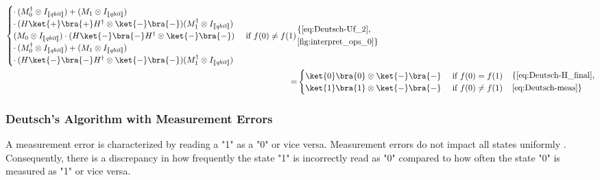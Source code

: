 \begin{align*}
\begin{cases}
    \cdot \hspace{2pt} (M_0^\dag \otimes I_{\llbracket \textit{qbit} \rrbracket}) + (M_1 \otimes I_{\llbracket \textit{qbit} \rrbracket})     \\
    \cdot \hspace{2pt} (H\ket{+} \bra{+}H^\dag \otimes \ket{-}\bra{-}) (M_1^\dag \otimes I_{\llbracket \textit{qbit} \rrbracket})\\
    (M_0 \otimes I_{\llbracket \textit{qbit} \rrbracket}) \cdot (H\ket{-} \bra{-}H^\dag \otimes \ket{-}\bra{-}) &\text{ if }   f(0) \neq f(1)\\
    \cdot \hspace{2pt} (M_0^\dag \otimes I_{\llbracket \textit{qbit} \rrbracket}) + (M_1 \otimes I_{\llbracket \textit{qbit} \rrbracket})  \\
     \cdot \hspace{2pt} (H\ket{-} \bra{-}H^\dag \otimes \ket{-}\bra{-}) (M_1^\dag \otimes I_{\llbracket \textit{qbit} \rrbracket})\\
   \end{cases} &   \begin{aligned}
    &\{\text{\autoref{eq:Deutsch-Uf_2}}, \\
    & \text{\autoref{fig:interpret_ops_0}}  \}
\end{aligned} \\
\hspace{2pt} = & 
\begin{cases}
  \ket{0} \bra{0}  \otimes \ket{-} \bra{-}  &\text{ if }   f(0)= f(1) \\
 \ket{1} \bra{1}  \otimes \ket{-} \bra{-} &\text{ if }   f(0) \neq f(1) 
\end{cases} 
&\begin{aligned}
  &\{\text{\autoref{eq:Deutsch-H_final}}, \\
  & \text{\autoref{eq:Deutsch-meas}}  \}
\end{aligned} \\
\end{align*}


\subsubsection{Deutsch's Algorithm with Measurement Errors}
  
  A measurement error is characterized by reading a "1" as a "0" or vice versa.  Measurement errors do not impact all states uniformly \cite{tannu2019mitigating}. Consequently, there is a discrepancy in how frequently the state "1" is incorrectly read as "0" compared to how often the state "0" is measured as "1" or vice versa.

